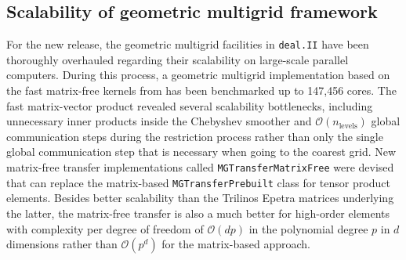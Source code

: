 \documentclass{ansarticle-preprint}
\newcommand{\specialword}[1]{\texttt{#1}}
\newcommand{\dealii}{{\specialword{deal.II}}}
\begin{document}
\subsection{Scalability of geometric multigrid framework}

For the new release, the geometric multigrid facilities in \dealii{} have been
thoroughly overhauled regarding their scalability on large-scale parallel
computers. During this process, a geometric multigrid implementation based on
the fast matrix-free kernels from \cite{KronbichlerKormann2012} has been
benchmarked up to 147,456 cores. The fast matrix-vector product revealed
several scalability bottlenecks, including unnecessary inner products inside
the Chebyshev smoother and $\mathcal O(n_\text{levels})$ global communication
steps during the restriction process rather than only the single global
communication step that is necessary when going to the coarest grid. New
matrix-free transfer implementations called \texttt{MGTransferMatrixFree} were
devised that can replace the matrix-based \texttt{MGTransferPrebuilt} class
for tensor product elements. Besides better scalability than the Trilinos
Epetra matrices underlying the latter, the matrix-free transfer is also a much
better for high-order elements with complexity per degree of freedom of
$\mathcal O(d p)$ in the polynomial degree $p$ in $d$ dimensions rather than
$\mathcal O(p^d)$ for the matrix-based approach.
\end{document}
